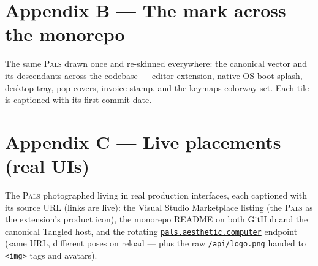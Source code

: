 \documentclass[10pt,letterpaper,twocolumn]{article}
\newcommand{\pals}{\textsc{Pals}}
\begin{document}



\newpage
\section*{Appendix B --- The mark across the monorepo}
\noindent The same \pals{} drawn once and re-skinned everywhere: the
canonical vector and its descendants across the codebase --- editor
extension, native-OS boot splash, desktop tray, pop covers, invoice stamp,
and the keymaps colorway set. Each tile is captioned with its first-commit date.
\vspace{1.2em}



\newpage
\section*{Appendix C --- Live placements (real UIs)}
\noindent The \pals{} photographed living in real production interfaces,
each captioned with its source URL (links are live): the Visual Studio
Marketplace listing (the \pals{} as the extension's product icon), the
monorepo README on both GitHub and the canonical Tangled host, and the
rotating \href{https://pals.aesthetic.computer}{\texttt{pals.aesthetic.computer}}
endpoint (same URL, different poses on reload --- plus the raw
\texttt{/api/logo.png} handed to \texttt{<img>} tags and avatars).
\vspace{1.0em}


\end{document}
